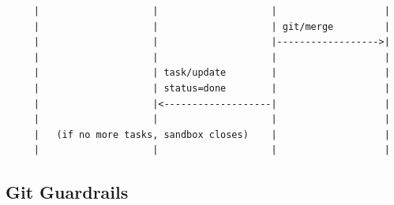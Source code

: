 \documentclass[11pt,a4paper]{article}
\begin{document}
\begin{verbatim}
     |                    |                    |                   |
     |                    |                    | git/merge         |
     |                    |                    |------------------>|
     |                    |                    |                   |
     |                    | task/update        |                   |
     |                    | status=done        |                   |
     |                    |<-------------------|                   |
     |                    |                    |                   |
     |   (if no more tasks, sandbox closes)    |                   |
     |                    |                    |                   |
\end{verbatim}

\subsection{Git Guardrails}
\end{document}
